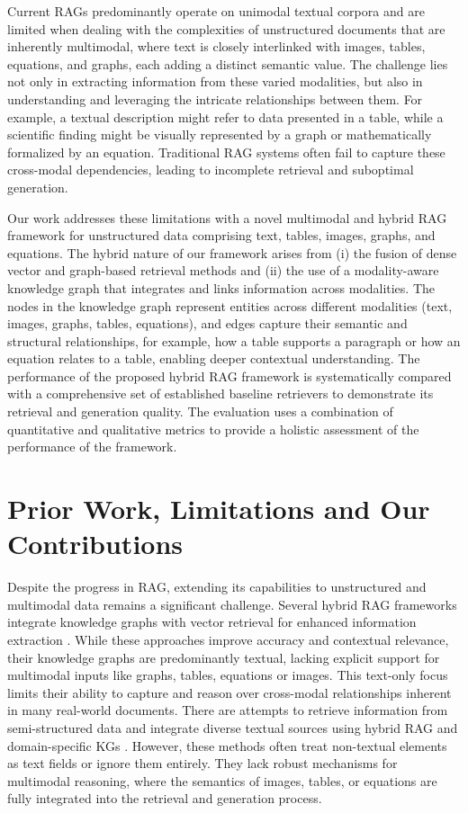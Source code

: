 \documentclass{svproc}
\begin{document}
Current RAGs predominantly operate on unimodal textual corpora
and are limited when dealing with the complexities of unstructured documents that are inherently multimodal, where text is closely interlinked with images, tables, equations, and graphs, each adding a distinct semantic value. The challenge lies not only in extracting information from these varied modalities, but also in understanding and leveraging the intricate relationships between them. For example, a textual description might refer to data presented in a table, while a scientific finding might be visually represented by a graph or mathematically formalized by an equation. Traditional RAG systems often fail to capture these cross-modal dependencies, leading to incomplete retrieval and suboptimal generation.


Our work addresses these limitations with a novel multimodal and hybrid RAG framework for unstructured data comprising text, tables, images, graphs, and equations. The hybrid nature of our framework arises from (i) the fusion of dense vector and graph-based retrieval methods and (ii) the use of a modality-aware knowledge graph that integrates and links information across modalities. The nodes in the knowledge graph represent entities across different modalities (text, images, graphs, tables, equations), and edges capture their semantic and structural relationships, for example, how a table supports a paragraph or how an equation relates to a table, enabling deeper contextual understanding. The performance of the proposed hybrid RAG framework is systematically compared with a comprehensive set of established baseline retrievers to demonstrate its retrieval and generation quality. The evaluation uses a combination of quantitative and qualitative metrics to provide a holistic assessment of the performance of the framework.

%
\section{Prior Work, Limitations and Our Contributions}
Despite the progress in RAG, extending its capabilities to unstructured and multimodal data remains a significant challenge.
Several hybrid RAG frameworks integrate knowledge graphs with vector retrieval for enhanced information extraction \cite{HybridRAG,KG-guided-RAG,DO-RAG}.
 While these approaches improve accuracy and contextual relevance, their knowledge graphs are predominantly textual, lacking explicit support for multimodal inputs like graphs, tables, equations or images. This text-only focus limits their ability to capture and reason over cross-modal relationships inherent in many real-world documents.
There are attempts to retrieve information from semi-structured data and integrate diverse textual sources using hybrid RAG \cite{HybGRAG} and domain-specific KGs
\cite{KG-RAG-Schema}. However, these methods often treat non-textual elements as text fields or ignore them entirely. They lack robust mechanisms for multimodal reasoning, where the semantics of images, tables, or equations are fully integrated into the retrieval and generation process.
\end{document}
